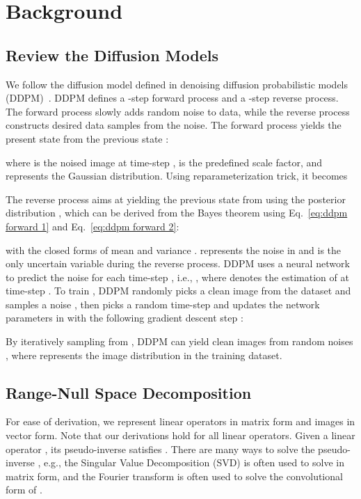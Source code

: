 \documentclass{article} \usepackage{iclr2023_conference,times}
\begin{document}
\section{Background}
\label{gen_inst}

\subsection{Review the Diffusion Models}
We follow the diffusion model defined in denoising diffusion probabilistic models (DDPM)~\citep{ho2020denoising}. DDPM defines a -step forward process and a -step reverse process. The forward process slowly adds random noise to data, while the reverse process constructs desired data samples from the noise. The forward process yields the present state  from the previous state :

where  is the noised image at time-step ,  is the predefined scale factor, and  represents the Gaussian distribution. Using reparameterization trick, it becomes

The reverse process aims at yielding the previous state  from  using the posterior distribution , which can be derived from the Bayes theorem using Eq.~\ref{eq:ddpm forward 1} and Eq.~\ref{eq:ddpm forward 2}:

with the closed forms of mean  and variance .  represents the noise in  and is the only uncertain variable during the reverse process. DDPM uses a neural network  to predict the noise  for each time-step , i.e., , where  denotes the estimation of  at time-step . To train  , DDPM randomly picks a clean image  from the dataset and samples a noise , then picks a random time-step  and updates the network parameters  in  with the following gradient descent step \citep{ho2020denoising}:

By iteratively sampling  from ,  DDPM can yield clean images  from random noises , where  represents the image distribution in the training dataset.


\subsection{Range-Null Space Decomposition}
\label{RND}
For ease of derivation, we represent linear operators in matrix form and images in vector form. Note that our derivations hold for all linear operators. Given a linear operator , its pseudo-inverse  satisfies . There are many ways to solve the pseudo-inverse , e.g., the Singular Value Decomposition (SVD) is often used to solve  in matrix form, and the Fourier transform is often used to solve the convolutional form of . 
\end{document}
